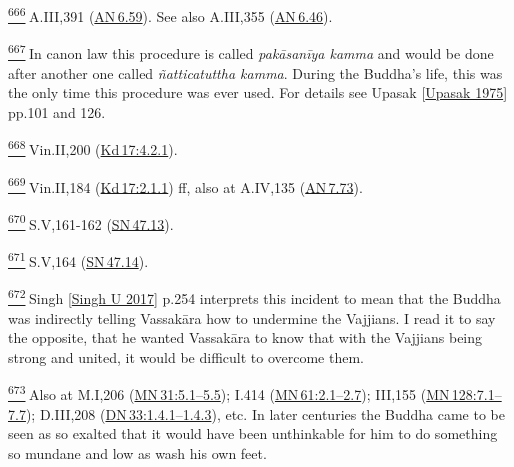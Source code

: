 \label{footprints_split_025.html_fn666}
\hyperref[footprints_split_016.htmlux5cux23fnref666]{\textsuperscript{666}} A.III,391
(\href{https://suttacentral.net/an6.59/en/sujato}{AN\,6.59}). See also
A.III,355 (\href{https://suttacentral.net/an6.46/en/sujato}{AN\,6.46}).

\label{footprints_split_025.html_fn667}
\hyperref[footprints_split_016.htmlux5cux23fnref667]{\textsuperscript{667}} In
canon law this procedure is called \emph{pakāsanīya kamma} and would be
done after another one called \emph{ñatticatuttha kamma}. During the
Buddha's life, this was the only time this procedure was ever used. For
details see {Upasak
{{[}\hyperref[footprints_split_022.htmlux5cux23Upasakux5cux25201975]{Upasak
1975}{]}}} pp.101 and 126.

\label{footprints_split_025.html_fn668}
\hyperref[footprints_split_016.htmlux5cux23fnref668]{\textsuperscript{668}} Vin.II,200
(\href{https://suttacentral.net/pli-tv-kd17/en/brahmali\#4.2.1}{Kd\,17:4.2.1}).

\label{footprints_split_025.html_fn669}
\hyperref[footprints_split_016.htmlux5cux23fnref669]{\textsuperscript{669}} Vin.II,184
(\href{https://suttacentral.net/pli-tv-kd17/en/brahmali\#2.1.1}{Kd\,17:2.1.1})
ff, also at A.IV,135
(\href{https://suttacentral.net/an7.73/en/sujato}{AN\,7.73}).

\label{footprints_split_025.html_fn670}
\hyperref[footprints_split_017.htmlux5cux23fnref670]{\textsuperscript{670}} S.V,161-162
(\href{https://suttacentral.net/sn47.13/en/sujato}{SN\,47.13}).

\label{footprints_split_025.html_fn671}
\hyperref[footprints_split_017.htmlux5cux23fnref671]{\textsuperscript{671}} S.V,164
(\href{https://suttacentral.net/sn47.14/en/sujato}{SN\,47.14}).

\label{footprints_split_025.html_fn672}
\hyperref[footprints_split_017.htmlux5cux23fnref672]{\textsuperscript{672}} {Singh
{{[}\hyperref[footprints_split_022.htmlux5cux23Singhux5cux2520Uux5cux25202017]{Singh
U 2017}{]}}} p.254 interprets this incident to mean that the Buddha was
indirectly telling Vassakāra how to undermine the Vajjians. I read it to
say the opposite, that he wanted Vassakāra to know that with the
Vajjians being strong and united, it would be difficult to overcome
them.

\label{footprints_split_025.html_fn673}
\hyperref[footprints_split_017.htmlux5cux23fnref673]{\textsuperscript{673}} Also
at M.I,206
(\href{https://suttacentral.net/mn31/en/sujato\#5.1}{MN\,31:5.1--5.5});
I.414
(\href{https://suttacentral.net/mn61/en/sujato\#2.1}{MN\,61:2.1--2.7});
III,155
(\href{https://suttacentral.net/mn128/en/sujato\#7.1}{MN\,128:7.1--7.7});
D.III,208
(\href{https://suttacentral.net/dn33/en/sujato\#1.4.1}{DN\,33:1.4.1--1.4.3}),
etc. In later centuries the Buddha came to be seen as so exalted that it
would have been unthinkable for him to do something so mundane and low
as wash his own feet.

